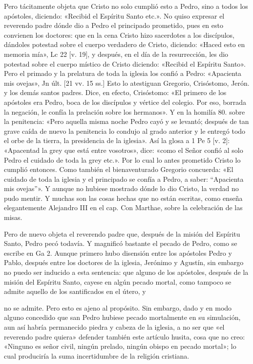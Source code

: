 Pero tácitamente objeta que Cristo no solo cumplió esto a Pedro, sino a todos los apóstoles, diciendo: «Recibid el Espíritu Santo etc.». No quiso expresar el reverendo padre dónde dio a Pedro el principado prometido, pues en esto convienen los doctores: que en la cena Cristo hizo sacerdotes a los discípulos, dándoles potestad sobre el cuerpo verdadero de Cristo, diciendo: «Haced esto en memoria mía», Lc 22 [v. 19], y después, en el día de la resurrección, les dio potestad sobre el cuerpo místico de Cristo diciendo: «Recibid el Espíritu Santo». Pero el primado y la prelatura de toda la iglesia los confió a Pedro: «Apacienta mis ovejas», Jn últ. [21 vv. 15 ss.] Esto lo atestiguan Gregorio, Crisóstomo, Jerón. y los demás santos padres. Dice, en efecto, Crisóstomo: «El primero de los apóstoles era Pedro, boca de los discípulos y vértice del colegio. Por eso, borrada la negación, le confía la prelación sobre los hermanos». Y en la homilía 80. sobre la penitencia: «Pero aquella misma noche Pedro cayó y se levantó; después de tan grave caída de nuevo la penitencia lo condujo al grado anterior y le entregó todo el orbe de la tierra, la presidencia de la iglesia». Así la glosa a 1 Pe 5 [v. 2]: «Apacentad la grey que está entre vosotros», dice: «como el Señor confió al solo Pedro el cuidado de toda la grey etc.». Por lo cual lo antes prometido Cristo lo cumplió entonces. Como también el bienaventurado Gregorio concuerda: «El cuidado de toda la iglesia y el principado se confía a Pedro, a saber: “Apacienta mis ovejas”». Y aunque no hubiese mostrado dónde lo dio Cristo, la verdad no pudo mentir. Y muchas son las cosas hechas que no están escritas, como enseña elegantemente Alejandro III en el cap. Con Marthae, sobre la celebración de las misas.

Pero de nuevo objeta el reverendo padre que, después de la misión del Espíritu Santo, Pedro pecó todavía. Y magnificó bastante el pecado de Pedro, como se escribe en Ga 2. Aunque primero hubo disensión entre los apóstoles Pedro y Pablo, después entre los doctores de la iglesia, Jerónimo y Agustín, sin embargo no puedo ser inducido a esta sentencia: que alguno de los apóstoles, después de la misión del Espíritu Santo, cayese en algún pecado mortal, como tampoco se admite aquello de los santificados en \marginpar{\small[294]} el útero, y

no se admite. Pero esto es ajeno al propósito. Sin embargo, dado y en modo alguno concedido que san Pedro hubiese pecado mortalmente en su simulación, aun así habría permanecido piedra y cabeza de la iglesia, a no ser que «el reverendo padre quiera» defender también este artículo husita, cosa que no creo: «Ninguno es señor civil, ningún prelado, ningún obispo en pecado mortal»; lo cual produciría la suma incertidumbre de la religión cristiana.

